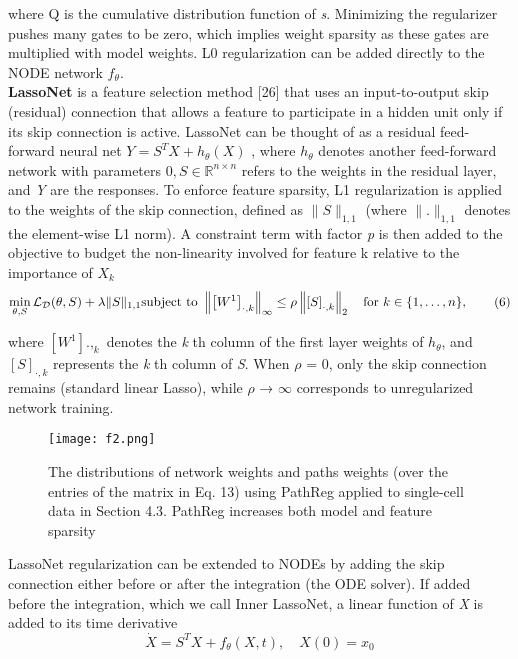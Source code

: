 \documentclass{article}
\begin{document}
    where Q is the cumulative distribution function of \textit{s}. Minimizing the regularizer pushes many gates
    to be zero, which implies weight sparsity as these gates are multiplied with model weights. L0
    regularization can be added directly to the NODE network $f_{\theta}$.\\
    \textbf{LassoNet} is a feature selection method [26] that uses an input-to-output skip (residual) connection
    that allows a feature to participate in a hidden unit only if its skip connection is active. LassoNet can
    be thought of as a residual feed-forward neural net $Y = S^T X + h_{\theta}(X)$
    , where $h_{\theta}$ denotes another
    feed-forward network with parameters $0, S \in \mathbb{R}^{n \times n}$
     refers to the weights in the residual layer, and \textit{Y}
    are the responses. To enforce feature sparsity, L1 regularization is applied to the weights of the skip
    connection, defined as $\|S\|_{1,1}$ (where $\|.\|_{1,1}$ denotes the element-wise L1 norm). A constraint term
    with factor \textit{p} is then added to the objective to budget the non-linearity involved for feature k relative
    to the importance of $X_{k}$
   \[
    \min_{\theta, S} \mathcal{L}_{\mathcal{D}}(\theta, S) + \lambda \|S\|_{1,1} \\
    \text{subject to } \left\| \left[W^1 \right]_{\cdot, k} \right\|_{\infty} \leq \rho \left\| \left[S \right]_{\cdot, k} \right\|_{2} \quad \text{for } k \in \{1, \dots, n\}, \tag{6}
    \]

    where $[W^1
    ].,_{k}$ denotes the \textit{k}
    th column of the first layer weights of $h_{\theta}$, and $[S]_{·,k}$ represents the \textit{ k}
    th
    column of \textit{S}. When $\rho$ = 0, only the skip connection remains (standard linear Lasso), while $\rho$ → $\infty$
    corresponds to unregularized network training.
    \setcounter{figure}{1}
    \begin{figure}[h]
    \centering
    \texttt{[image: f2.png]}
    \caption{The distributions of network weights and paths weights (over the entries of the matrix in
    Eq. 13) using PathReg applied to single-cell data in Section 4.3. PathReg increases both model and
    feature sparsity}
    \label{fig:f2}
    \end{figure}

    LassoNet regularization can be extended to NODEs by adding the skip connection either before or
    after the integration (the ODE solver). If added before the integration, which we call Inner LassoNet,
    a linear function of \textit{X} is added to its time derivative
   \[
  \dot{X} = S^T X + f_{\theta}(X, t), \quad X(0) = x_0 \tag{7}
 \]
\end{document}
